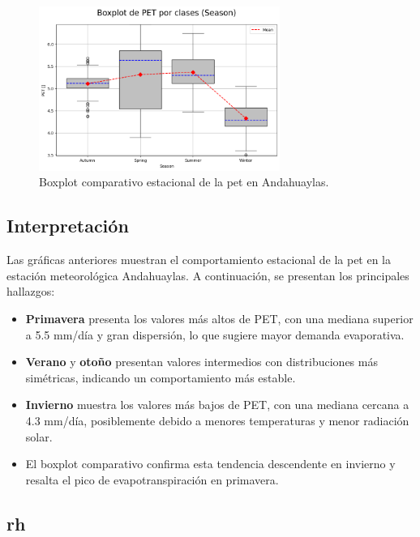 \vspace{0.2cm}

\begin{figure}[htbp]
\centering
\includegraphics[width=0.7\textwidth]{resultados/por_estacion_del_anio/boxplot_clases_por_estacion/Andahuaylas/PET_ClassBoxplot_Season.png}
\caption{Boxplot comparativo estacional de la \gls{pet}  en Andahuaylas.}
\label{fig:andahuaylas_pet_box}
\end{figure}

\subsection*{Interpretación}

Las gráficas anteriores muestran el comportamiento estacional de la \gls{pet}  en la estación meteorológica Andahuaylas. A continuación, se presentan los principales hallazgos:

\begin{itemize}
    \item \textbf{Primavera} presenta los valores más altos de PET, con una mediana superior a 5.5 mm/día y gran dispersión, lo que sugiere mayor demanda evaporativa.
    \item \textbf{Verano} y \textbf{otoño} presentan valores intermedios con distribuciones más simétricas, indicando un comportamiento más estable.
    \item \textbf{Invierno} muestra los valores más bajos de PET, con una mediana cercana a 4.3 mm/día, posiblemente debido a menores temperaturas y menor radiación solar.
    \item El boxplot comparativo confirma esta tendencia descendente en invierno y resalta el pico de evapotranspiración en primavera.
\end{itemize}


\subsection{\gls{rh} }

